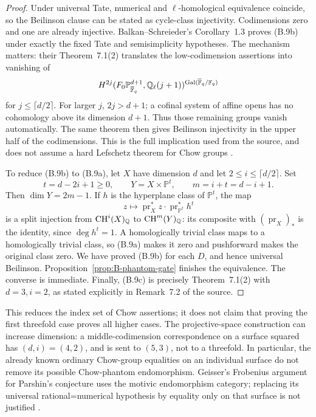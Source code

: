 \begin{proof}
Under universal Tate, numerical and \(\ell\)-homological
equivalence coincide, so the Beilinson clause can be stated as
cycle-class injectivity.  Codimensions zero and one are already
injective.  Balkan--Schreieder's Corollary~1.3 proves (B.9b)
under exactly the fixed Tate and semisimplicity hypotheses.
The mechanism matters: their Theorem~7.1(2) translates the
low-codimension assertions into vanishing of
\[
 H^{2j}(F_0\mathbb P^{d+1}_{\overline{\mathbb F}_q},
        \mathbb Q_\ell(j+1))^{\operatorname{Gal}(\overline{\mathbb F}_q/\mathbb F_q)}
\]
for \(j\le\lceil d/2\rceil\).  For larger \(j\),
\(2j>d+1\); a cofinal system of affine opens has no
cohomology above its dimension \(d+1\).  Thus those remaining
groups vanish automatically.  The same theorem then gives
Beilinson injectivity in the upper half of the codimensions.
This is the full implication used from the source, and does not
assume a hard Lefschetz theorem for Chow groups
\cite[Corollary~1.3, Theorem~7.1 and its proof in \S7.4]
{BBalkanSchreieder2026}.

To reduce (B.9b) to (B.9a), let \(X\) have dimension \(d\)
and let \(2\le i\le\lceil d/2\rceil\).  Set
\[
 t=d-2i+1\ge0,\qquad Y=X\times\mathbb P^t,
 \qquad m=i+t=d-i+1.
\]
Then \(\dim Y=2m-1\).  If \(h\) is the hyperplane
class of \(\mathbb P^t\), the map
\[
 z\longmapsto \operatorname{pr}_X^*z\cdot
                   \operatorname{pr}_{\mathbb P^t}^*h^t
\]
is a split injection from \(\operatorname{CH}^i(X)_\mathbb Q\)
to \(\operatorname{CH}^m(Y)_\mathbb Q\): its composite with
\((\operatorname{pr}_X)_*\) is the identity, since
\(\deg h^t=1\).  A homologically trivial class maps to
a homologically trivial class, so (B.9a) makes it zero and
pushforward makes the original class zero.  We have proved
(B.9b) for each \(D\), and hence universal Beilinson.
Proposition~\ref{prop:B-phantom-gate} finishes the equivalence.
The converse is immediate.  Finally, (B.9c) is precisely
Theorem~7.1(2) with \(d=3,i=2\), as stated explicitly
in Remark~7.2 of the source.
\end{proof}

This reduces the index set of Chow assertions; it does not claim
that proving the first threefold case proves all higher cases.
The projective-space construction can increase dimension: a
middle-codimension correspondence on a surface squared has
\((d,i)=(4,2)\), and is sent to \((5,3)\), not to a
threefold.  In particular, the already known ordinary Chow-group
equalities on an individual surface do not remove its possible
Chow-phantom endomorphism.  Geisser's Frobenius argument for
Parshin's conjecture uses the motivic endomorphism category;
replacing its universal rational=numerical hypothesis by equality
only on that surface is not justified
\cite[Propositions~2.3, 3.1--3.2 and Theorem~3.3]{BGeisser1998}.

